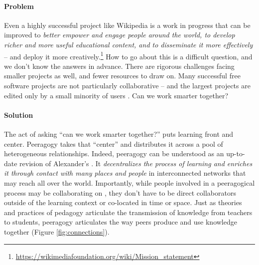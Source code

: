 \begin{refsection}
\paragraph{Problem} Even a highly successful project like Wikipedia is a work in progress that can be improved to \emph{\emph{better} empower and engage people around the world, to develop \emph{richer and more useful} educational content, and to disseminate it \emph{more} effectively} -- and deploy it more creatively.\footnote{\url{https://wikimediafoundation.org/wiki/Mission_statement}}  How to go about this is a difficult question, and we don't know the answers in advance.  There are rigorous challenges facing smaller projects as well, and fewer resources to draw on.  Many successful free software projects are not particularly collaborative -- and the largest projects are edited only by a small minority of users \cite{free-software-better,who-writes-wikipedia}.  Can we work smarter together?

\paragraph{Solution} The act of asking ``can we work smarter together?'' puts learning front and center.  Peeragogy takes that ``center'' and distributes it across a pool of heterogeneous relationships.  Indeed, peeragogy can be understood as an up-to-date revision of Alexander's  \cite[p. 99]{alexander1977pattern}.  It \emph{decentralizes the process of learning and enriches it through contact with many places and people} in interconnected networks that may reach all over the world.   Importantly, while people involved in a peeragogical process may be collaborating on , they don't have to be direct collaborators outside of the learning context or co-located in time or space.  Just as theories and practices of pedagogy articulate the transmission of knowledge from teachers to students, peeragogy articulates the way peers produce and use knowledge together (Figure \ref{fig:connections}).



\end{refsection}
